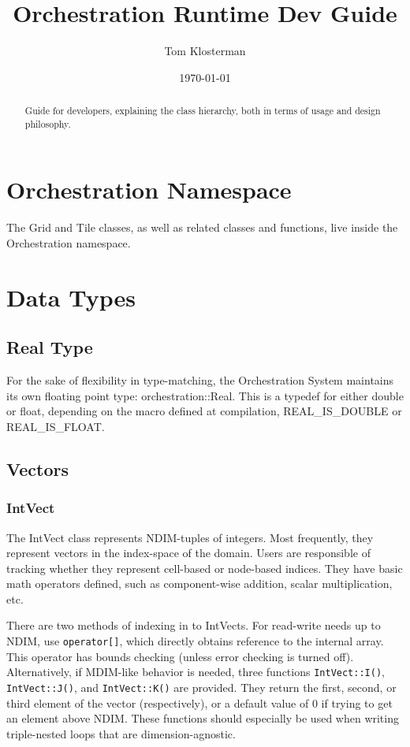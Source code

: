 \documentclass[letterpaper,12pt]{article}
\begin{document}
\title{Orchestration Runtime Dev Guide}
\author{Tom Klosterman}
\date{\today}
\maketitle

\begin{abstract}
Guide for developers, explaining the class hierarchy, both in terms of usage and design philosophy.\end{abstract}

\section{Orchestration Namespace}

The Grid and Tile classes, as well as related classes and functions, live inside the Orchestration namespace.

\section{Data Types}
\subsection{Real Type}

For the sake of flexibility in type-matching, the Orchestration System maintains its own floating point type: orchestration::Real. This is a typedef for either double or float, depending on the macro defined at compilation, REAL\_IS\_DOUBLE or REAL\_IS\_FLOAT.

\subsection{Vectors}
\subsubsection{IntVect}

The IntVect class represents NDIM-tuples of integers. Most frequently, they represent vectors in the index-space of the domain. Users are responsible of tracking whether they represent cell-based or node-based indices. They have basic math operators defined, such as component-wise addition, scalar multiplication, etc.

There are two methods of indexing in to IntVects. For read-write needs up to NDIM, use  \texttt{operator[]}, which directly obtains reference to the internal array. This operator has bounds checking (unless error checking is turned off). Alternatively, if MDIM-like behavior is needed, three functions \texttt{IntVect::I()}, \texttt{IntVect::J()}, and \texttt{IntVect::K()} are provided. They return the first, second, or third element of the vector (respectively), or a default value of 0 if trying to get an element above NDIM. These functions should especially be used when writing triple-nested loops that are dimension-agnostic.
\end{document}
